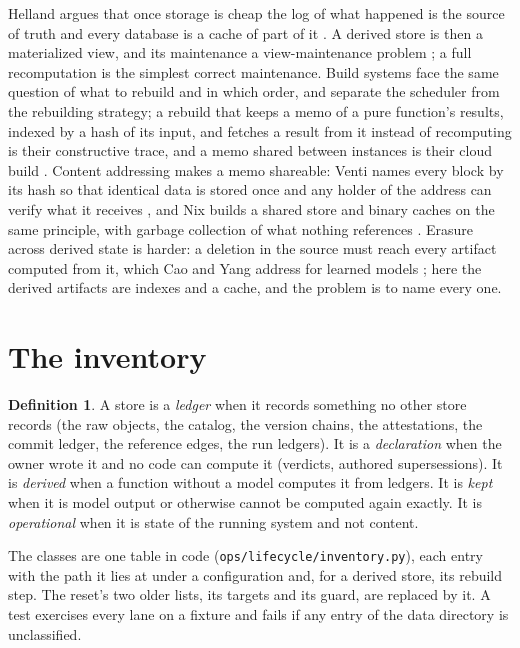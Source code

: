 \documentclass[11pt]{article}
\theoremstyle{plain}
\theoremstyle{definition}
\newtheorem{definition}{Definition}
\theoremstyle{remark}
\newcommand{\code}[1]{\texttt{#1}}
\begin{document}
Helland argues that once storage is cheap the log of what happened is the source of truth and every
database is a cache of part of it \citep{helland2015immutability}. A derived store is then a
materialized view, and its maintenance a view-maintenance problem \citep{gupta1995views}; a full
recomputation is the simplest correct maintenance. Build systems face the same question of what to
rebuild and in which order, and separate the scheduler from the rebuilding strategy; a rebuild that
keeps a memo of a pure function's results, indexed by a hash of its input, and fetches a result
from it instead of recomputing is their constructive trace, and a memo shared between instances is
their cloud build \citep{mokhov2018build}. Content addressing makes a memo shareable: Venti
names every block by its hash so that identical data is stored once and any holder of the address
can verify what it receives \citep{quinlan2002venti}, and Nix builds a shared store and binary
caches on the same principle, with garbage collection of what nothing references
\citep{dolstra2004nix}. Erasure across derived state is harder: a deletion in the source must reach
every artifact computed from it, which Cao and Yang address for learned models
\citep{cao2015unlearning}; here the derived artifacts are indexes and a cache, and the problem is to
name every one.

\section{The inventory}\label{sec:inventory}

\begin{definition}
A store is a \emph{ledger} when it records something no other store records (the raw objects, the
catalog, the version chains, the attestations, the commit ledger, the reference edges, the run
ledgers). It is a \emph{declaration} when the owner wrote it and no code can compute it (verdicts,
authored supersessions). It is \emph{derived} when a function without a model computes it from
ledgers. It is \emph{kept} when it is model output or otherwise cannot be computed again exactly. It
is \emph{operational} when it is state of the running system and not content.
\end{definition}

The classes are one table in code (\code{ops/lifecycle/inventory.py}), each entry with the path it
lies at under a configuration and, for a derived store, its rebuild step. The reset's two older
lists, its targets and its guard, are replaced by it. A test exercises every lane on a fixture and
fails if any entry of the data directory is unclassified.
\end{document}
